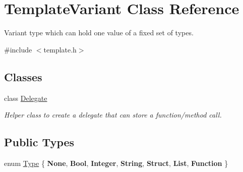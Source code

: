 \hypertarget{class_template_variant}{}\section{Template\+Variant Class Reference}
\label{class_template_variant}


Variant type which can hold one value of a fixed set of types.  




{\ttfamily \#include $<$template.\+h$>$}

\subsection*{Classes}
\begin{DoxyCompactItemize}
\item 
class \mbox{\hyperlink{class_template_variant_1_1_delegate}{Delegate}}
\begin{DoxyCompactList}\small\item\em Helper class to create a delegate that can store a function/method call. \end{DoxyCompactList}\end{DoxyCompactItemize}
\subsection*{Public Types}
\begin{DoxyCompactItemize}
\item 
enum \mbox{\hyperlink{class_template_variant_a4c0d322ba971480bfbd2a8f418eadc81}{Type}} \{ \newline
{\bfseries None}, 
{\bfseries Bool}, 
{\bfseries Integer}, 
{\bfseries String}, 
\newline
{\bfseries Struct}, 
{\bfseries List}, 
{\bfseries Function}
 \}
\end{DoxyCompactItemize}
